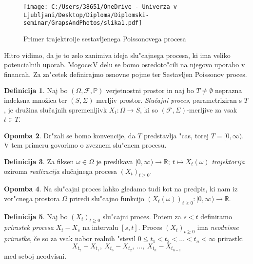 \documentclass[12pt,a4paper]{amsart}
\theoremstyle{definition} %
\newtheorem{definicija}{Definicija}[section]
\newtheorem{opomba}[definicija]{Opomba}
\theoremstyle{plain} %
\newcommand{\1}{\mathds{1}}
\begin{document}
    \begin{figure}[H]
        \centering
        \texttt{[image: C:/Users/38651/OneDrive - Univerza v Ljubljani/Desktop/Diploma/Diplomski-seminar/GrapsAndPhotos/slika1.pdf]}
        \caption{Primer trajektroije sestavljenega Poissonovega procesa}
        \label{fig:slika1}
    \end{figure}
    
    \noindent
    Hitro vidimo, da je to zelo zanimiva ideja slu"cajnega
    procesa, ki ima veliko potencialnih uporab. Mogoce:V delu se bomo osredoto"cili na njegovo uporabo v 
    financah. Za za"cetek definirajmo osnovne pojme ter Sestavljen Poissonov proces.

    \begin{definicija}
        Naj bo $(\Omega, \mathcal{F}, \mathbb{P})$ verjetnostni prostor in naj bo $T\neq\emptyset$
        neprazna indeksna množica ter $(S, \Sigma)$ merljiv prostor. \textit{Slučajni proces}, 
        parametriziran s $T$, je družina slučajnih spremenljivk $X_t : \Omega \to S$,
         ki so $(\mathcal{F}, \Sigma)$-merljive za vsak $t \in T$.
        \label{def:slucProc}
    \end{definicija}

    \begin{opomba}
        Dr"zali se bomo konvencije, da $T$ predstavlja "cas, torej $T = [0, \infty)$.
        V tem primeru govorimo o zveznem slu"cnem procesu.
        \label{op:TCas}
    \end{opomba}

    \begin{definicija}
        Za fiksen $\omega \in \Omega$ je preslikava 
        $[0, \infty) \rightarrow \mathbb{R}; \ t \mapsto X_t(\omega)$ 
        \textit{trajektorija} oziroma \textit{realizacija} slučajnega procesa $(X_t)_{t\geq0}$.
        \label{def:realizac}
    \end{definicija}

    \begin{opomba}
        Na slu"cajni proces lahko gledamo tudi kot na predpis, ki nam iz vor"cnega prostora 
        $\Omega$ priredi slu"cajno funkcijo
        $(X_t(\omega))_{t\geq0}: [0, \infty) \rightarrow \mathbb{R}$.
        \label{op:slucFunkc}
    \end{opomba}

    \begin{definicija}
        Naj bo $(X_t)_{t\geq0}$ slu"cajni proces. Potem za $s < t$ definiramo
        \textit{prirastek procesa} $X_t - X_s$ na intervalu $[s, t]$. Proces $(X_t)_{t\geq0}$ ima 
        \textit{neodvisne prirastke}, če so za vsak nabor realnih "stevil
        $0 \leq t_1 < t_2 < \ldots < t_n < \infty$ prirastki
        $$
            X_{t_2} - X_{t_1}, \ X_{t_3} - X_{t_2}, \ \ldots, \ X_{t_n} - X_{t_{n-1}}
        $$
        med seboj neodvisni.
        \label{def:prirastek}
    \end{definicija}
\end{document}
